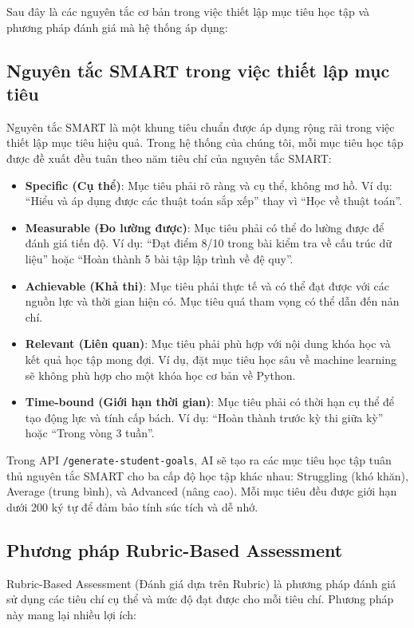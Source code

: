 Sau đây là các nguyên tắc cơ bản trong việc thiết lập mục tiêu học tập và phương pháp đánh giá mà hệ thống áp dụng:

\subsection{Nguyên tắc SMART trong việc thiết lập mục tiêu}
Nguyên tắc SMART là một khung tiêu chuẩn được áp dụng rộng rãi trong việc thiết lập mục tiêu hiệu quả. Trong hệ thống của chúng tôi, mỗi mục tiêu học tập được đề xuất đều tuân theo năm tiêu chí của nguyên tắc SMART:

\begin{itemize}
    \item \textbf{Specific (Cụ thể)}: Mục tiêu phải rõ ràng và cụ thể, không mơ hồ. Ví dụ: ``Hiểu và áp dụng được các thuật toán sắp xếp'' thay vì ``Học về thuật toán''.
    
    \item \textbf{Measurable (Đo lường được)}: Mục tiêu phải có thể đo lường được để đánh giá tiến độ. Ví dụ: ``Đạt điểm 8/10 trong bài kiểm tra về cấu trúc dữ liệu'' hoặc ``Hoàn thành 5 bài tập lập trình về đệ quy''.
    
    \item \textbf{Achievable (Khả thi)}: Mục tiêu phải thực tế và có thể đạt được với các nguồn lực và thời gian hiện có. Mục tiêu quá tham vọng có thể dẫn đến nản chí.
    
    \item \textbf{Relevant (Liên quan)}: Mục tiêu phải phù hợp với nội dung khóa học và kết quả học tập mong đợi. Ví dụ, đặt mục tiêu học sâu về machine learning sẽ không phù hợp cho một khóa học cơ bản về Python.
    
    \item \textbf{Time-bound (Giới hạn thời gian)}: Mục tiêu phải có thời hạn cụ thể để tạo động lực và tính cấp bách. Ví dụ: ``Hoàn thành trước kỳ thi giữa kỳ'' hoặc ``Trong vòng 3 tuần''.
\end{itemize}

Trong API \texttt{/generate-student-goals}, AI sẽ tạo ra các mục tiêu học tập tuân thủ nguyên tắc SMART cho ba cấp độ học tập khác nhau: Struggling (khó khăn), Average (trung bình), và Advanced (nâng cao). Mỗi mục tiêu đều được giới hạn dưới 200 ký tự để đảm bảo tính súc tích và dễ nhớ.

\subsection{Phương pháp Rubric-Based Assessment}
Rubric-Based Assessment (Đánh giá dựa trên Rubric) là phương pháp đánh giá sử dụng các tiêu chí cụ thể và mức độ đạt được cho mỗi tiêu chí. Phương pháp này mang lại nhiều lợi ích:

